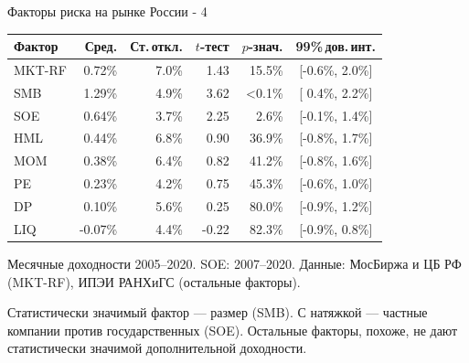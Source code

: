 \documentclass{beamer}
\begin{document}
\begin{frame}{Факторы риска на рынке России - 4}
\centering
\begin{tabular}{l|r|r|r|r|c}
Фактор & Сред. & Ст.\,откл. & $t$-тест & $p$-знач. & 99\%\,дов.\,инт. \\
\hline
MKT-RF  &  0.72\% & 7.0\% &  1.43 & 15.5\% & [-0.6\%, 2.0\%] \\
SMB     &  1.29\% & 4.9\% &  3.62 & <0.1\% & [ 0.4\%, 2.2\%] \\ 
SOE     &  0.64\% & 3.7\% &  2.25 &  2.6\% & [-0.1\%, 1.4\%] \\
HML     &  0.44\% & 6.8\% &  0.90 & 36.9\% & [-0.8\%, 1.7\%] \\
MOM     &  0.38\% & 6.4\% &  0.82 & 41.2\% & [-0.8\%, 1.6\%] \\  
PE      &  0.23\% & 4.2\% &  0.75 & 45.3\% & [-0.6\%, 1.0\%] \\
DP      &  0.10\% & 5.6\% &  0.25 & 80.0\% & [-0.9\%, 1.2\%] \\
LIQ     & -0.07\% & 4.4\% & -0.22 & 82.3\% & [-0.9\%, 0.8\%] \\ \hline
\end{tabular}

\justify
{\scriptsize Месячные доходности 2005--2020. SOE: 2007--2020. Данные: МосБиржа и ЦБ РФ (MKT-RF), ИПЭИ РАНХиГС (остальные факторы).}

\justify
Статистически значимый фактор --- размер (SMB). С натяжкой ---  частные компании против государственных (SOE). Остальные факторы, похоже, не дают статистически значимой дополнительной доходности.
\end{frame}
\end{document}
